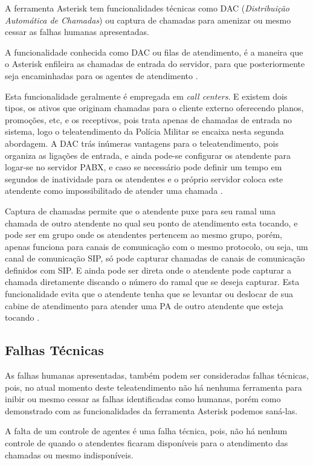 A ferramenta Asterisk tem funcionalidades técnicas como DAC (\textit{Distribuição Automática de Chamadas}) ou captura de chamadas para amenizar ou mesmo cessar as falhas humanas apresentadas.

A funcionalidade conhecida como DAC ou filas de atendimento, é a maneira que o Asterisk enfileira as chamadas de entrada do servidor, para que posteriormente seja encaminhadas para os agentes de atendimento \cite{flavioeduardoandredade2005}.

Esta funcionalidade geralmente é empregada em \textit{call centers}. E existem dois tipos, os ativos que originam chamadas para o cliente externo oferecendo planos, promoções, etc, e os receptivos, pois trata apenas de chamadas de entrada no sistema, logo o teleatendimento da Polícia Militar se encaixa nesta segunda abordagem. A DAC trás inúmeras vantagens para o teleatendimento, pois organiza as ligações de entrada, e ainda pode-se configurar os atendente para logar-se no servidor PABX, e caso se necessário pode definir um tempo em segundos de inatividade para os atendentes e o próprio servidor coloca este atendente como impossibilitado de atender uma chamada \cite{alexandrekeller2014}.

Captura de chamadas permite que o atendente puxe para seu ramal uma chamada de outro atendente no qual seu ponto de atendimento esta tocando, e pode ser em grupo onde os atendentes pertencem ao mesmo grupo, porém, apenas funciona para canais de comunicação com o mesmo protocolo, ou seja, um canal de comunicação SIP, só pode capturar chamadas de canais de comunicação definidos com SIP. E ainda pode ser direta onde o atendente pode capturar a chamada diretamente discando o número do ramal que se deseja capturar. Esta funcionalidade evita que o atendente tenha que se levantar ou deslocar de sua cabine de atendimento para atender uma PA de outro atendente que esteja tocando \cite{alexandrekeller2014}. 

\subsection{Falhas Técnicas}
As falhas humanas apresentadas, também podem ser consideradas falhas técnicas, pois, no atual momento deste teleatendimento não há nenhuma ferramenta para inibir ou mesmo cessar as falhas identificadas como humanas, porém como demonstrado com as funcionalidades da ferramenta Asterisk podemos saná-las.

A falta de um controle de agentes é uma falha técnica, pois, não há nenhum controle de quando o atendentes ficaram disponíveis para o atendimento das chamadas ou mesmo indisponíveis.


